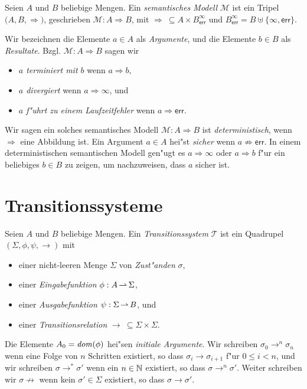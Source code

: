 \documentclass[12pt,a4paper,final]{article}
\begin{document}
\begin{definition}
  Seien $A$ und $B$ beliebige Mengen.
  Ein \emph{semantisches Modell} $\mathcal{M}$ ist ein Tripel $\bigl(A, B, \Rightarrow\bigr)$,
  geschrieben $\mathcal{M}: A \Rightarrow B$, mit \mbox{$\Rightarrow\ \subseteq A \times B^\infty_{\textsf{err}}$}
  und $B^\infty_{\textsf{err}} = B \uplus \{\infty,\textsf{err}\}$.
\end{definition}
Wir bezeichnen die Elemente $a \in A$ als \emph{Argumente}, und die Elemente $b \in B$
als \emph{Resultate}. Bzgl. $\mathcal{M}: A \Rightarrow B$ sagen wir
\begin{itemize}
\item \emph{$a$ terminiert mit $b$} wenn $a \Rightarrow b$,
\item \emph{$a$ divergiert} wenn $a \Rightarrow \infty$, und
\item \emph{$a$ f"uhrt zu einem Laufzeitfehler} wenn $a \Rightarrow \textsf{err}$.
\end{itemize}
Wir sagen ein solches semantisches Modell \mbox{$\mathcal{M}: A \Rightarrow B$} ist \emph{deterministisch},
wenn $\Rightarrow$ eine Abbildung ist. Ein Argument \mbox{$a \in A$} hei"st \emph{sicher} wenn
\mbox{$a \not\Rightarrow \textsf{err}$}. In einem deterministischen semantischen Modell gen"ugt es
\mbox{$a \Rightarrow \infty$} oder \mbox{$a \Rightarrow b$} f"ur ein beliebiges \mbox{$b \in B$} zu zeigen,
um nachzuweisen, dass $a$ sicher ist.



\section{Transitionssysteme}
\label{sec:Transitionssysteme}

\begin{definition}[Transitionssystem]
  Seien $A$ und $B$ beliebige Mengen.
  Ein \emph{Transitionssystem} $\mathcal{T}$ ist ein Quadrupel \mbox{$(\Sigma,\phi,\psi,\rightarrow)$} mit
  \begin{itemize}
  \item einer nicht-leeren Menge $\Sigma$ von \emph{Zust"anden} $\sigma$,
  \item einer \emph{Eingabefunktion} \mbox{$\phi:A \operatorname{\rightharpoonup} \Sigma$},
  \item einer \emph{Ausgabefunktion} \mbox{$\psi:\Sigma \operatorname{\rightharpoonup} B$}, und
  \item einer \emph{Transitionsrelation} $\rightarrow\ \subseteq \Sigma \times \Sigma$.
  \end{itemize}
\end{definition}
Die Elemente $A_0 = \operatorname{\mathit{dom}}(\phi)$ hei"sen \emph{initiale Argumente}. Wir schreiben
\mbox{$\sigma_0 \rightarrow^n \sigma_n$} wenn eine Folge von $n$ Schritten existiert,
so dass \mbox{$\sigma_i \rightarrow \sigma_{i+1}$} f"ur $0 \le i < n$, und wir schreiben
\mbox{$\sigma \rightarrow^* \sigma'$} wenn ein $n \in \mathbb N$ existiert, so dass
\mbox{$\sigma \rightarrow^n \sigma'$}. Weiter schreiben wir \mbox{$\sigma \not\rightarrow$}
wenn kein $\sigma' \in \Sigma$ existiert, so dass \mbox{$\sigma \rightarrow \sigma'$}.
\end{document}
